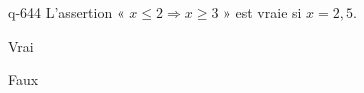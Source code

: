 \begin{truefalse}{q-644}
L'assertion « $x\leq 2 \Rightarrow x \geq 3$ » est vraie si $x=2,5$.
\item* Vrai
\item Faux
\end{truefalse}

